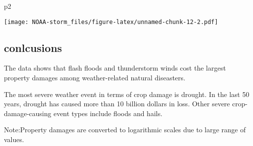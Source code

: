 \documentclass[]{article}
\newenvironment{Shaded}{\begin{snugshade}}{\end{snugshade}}
\newcommand{\NormalTok}[1]{#1}
\begin{document}
\begin{Shaded}
\begin{Highlighting}[]
\NormalTok{p2}
\end{Highlighting}
\end{Shaded}

\texttt{[image: NOAA-storm\_files/figure-latex/unnamed-chunk-12-2.pdf]}

\subsection{conlcusions}\label{conlcusions}

The data shows that flash floods and thunderstorm winds cost the largest
property damages among weather-related natural diseasters.

The most severe weather event in terms of crop damage is drought. In the
last 50 years, drought has caused more than 10 billion dollars in loss.
Other severe crop-damage-causing event types include floods and hails.

Note:Property damages are converted to logarithmic scales due to large
range of values.
\end{document}

